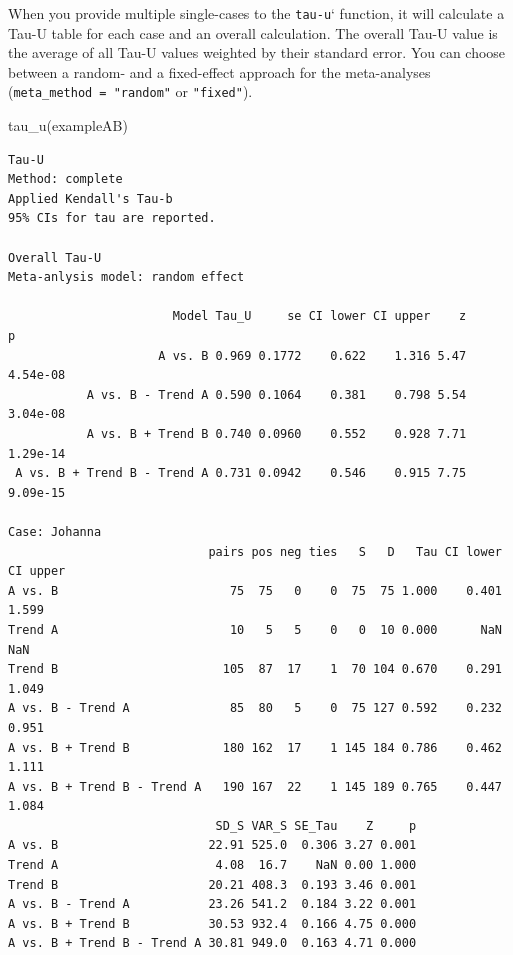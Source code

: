 \documentclass[
]{book}
\newenvironment{Shaded}{\begin{snugshade}}{\end{snugshade}}
\newcommand{\FunctionTok}[1]{\textcolor[rgb]{0.00,0.00,0.00}{#1}}
\newcommand{\NormalTok}[1]{#1}
\begin{document}
When you provide multiple single-cases to the \texttt{tau-u}` function, it will calculate a Tau-U table for each case and an overall calculation. The overall Tau-U value is the average of all Tau-U values weighted by their standard error. You can choose between a random- and a fixed-effect approach for the meta-analyses (\texttt{meta\_method\ =\ "random"} or \texttt{"fixed"}).

\begin{Shaded}
\begin{Highlighting}[]
\FunctionTok{tau\_u}\NormalTok{(exampleAB)}
\end{Highlighting}
\end{Shaded}

\begin{verbatim}
Tau-U
Method: complete 
Applied Kendall's Tau-b
95% CIs for tau are reported.

Overall Tau-U
Meta-anlysis model: random effect

                       Model Tau_U     se CI lower CI upper    z        p
                     A vs. B 0.969 0.1772    0.622    1.316 5.47 4.54e-08
           A vs. B - Trend A 0.590 0.1064    0.381    0.798 5.54 3.04e-08
           A vs. B + Trend B 0.740 0.0960    0.552    0.928 7.71 1.29e-14
 A vs. B + Trend B - Trend A 0.731 0.0942    0.546    0.915 7.75 9.09e-15

Case: Johanna 
                            pairs pos neg ties   S   D   Tau CI lower CI upper
A vs. B                        75  75   0    0  75  75 1.000    0.401    1.599
Trend A                        10   5   5    0   0  10 0.000      NaN      NaN
Trend B                       105  87  17    1  70 104 0.670    0.291    1.049
A vs. B - Trend A              85  80   5    0  75 127 0.592    0.232    0.951
A vs. B + Trend B             180 162  17    1 145 184 0.786    0.462    1.111
A vs. B + Trend B - Trend A   190 167  22    1 145 189 0.765    0.447    1.084
                             SD_S VAR_S SE_Tau    Z     p
A vs. B                     22.91 525.0  0.306 3.27 0.001
Trend A                      4.08  16.7    NaN 0.00 1.000
Trend B                     20.21 408.3  0.193 3.46 0.001
A vs. B - Trend A           23.26 541.2  0.184 3.22 0.001
A vs. B + Trend B           30.53 932.4  0.166 4.75 0.000
A vs. B + Trend B - Trend A 30.81 949.0  0.163 4.71 0.000


\end{verbatim}
\end{document}
